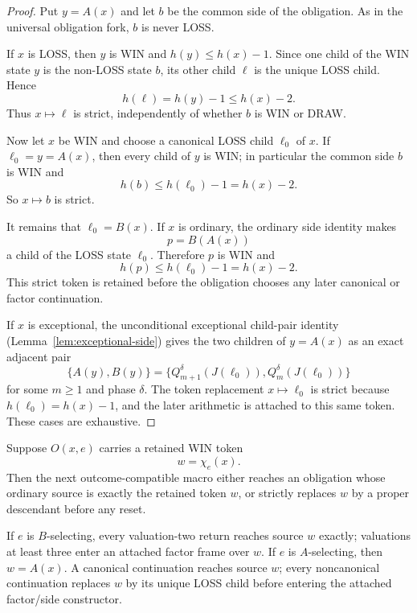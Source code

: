 \begin{proof}
Put $y=A(x)$ and let $b$ be the common side of the obligation.  As in the
universal obligation fork, $b$ is never LOSS.

If $x$ is LOSS, then $y$ is WIN and $h(y)\le h(x)-1$.  Since one child of
the WIN state $y$ is the non-LOSS state $b$, its other child $\ell$ is the
unique LOSS child.  Hence
\[
 h(\ell)=h(y)-1\le h(x)-2.
\]
Thus $x\mapsto\ell$ is strict, independently of whether $b$ is WIN or DRAW.

Now let $x$ be WIN and choose a canonical LOSS child $\ell_0$ of $x$.
If $\ell_0=y=A(x)$, then every child of $y$ is WIN; in particular the common
side $b$ is WIN and
\[
 h(b)\le h(\ell_0)-1=h(x)-2.
\]
So $x\mapsto b$ is strict.

It remains that $\ell_0=B(x)$.  If $x$ is ordinary, the ordinary side
identity makes
\[
 p=B(A(x))
\]
a child of the LOSS state $\ell_0$.  Therefore $p$ is WIN and
\[
 h(p)\le h(\ell_0)-1=h(x)-2.
\]
This strict token is retained before the obligation chooses any later
canonical or factor continuation.

If $x$ is exceptional, the unconditional exceptional child-pair identity
(Lemma~\ref{lem:exceptional-side}) gives the two children of $y=A(x)$ as an
exact adjacent pair
\[
 \{A(y),B(y)\}
 =\{Q_{m+1}^{\delta}(J(\ell_0)),Q_m^{\delta}(J(\ell_0))\}
\]
for some $m\ge1$ and phase $\delta$.  The token replacement
$x\mapsto\ell_0$ is strict because $h(\ell_0)=h(x)-1$, and the later
arithmetic is attached to this same token.  These cases are exhaustive.
\end{proof}

\begin{lemma}
\label{lem:aligned-catch}
Suppose $O(x,e)$ carries a retained WIN token
\[
 w=\chi_e(x).
\]
Then the next outcome-compatible macro either reaches an obligation whose
ordinary source is exactly the retained token $w$, or strictly replaces
$w$ by a proper descendant before any reset.

If $e$ is $B$-selecting, every valuation-two return reaches source $w$
exactly; valuations at least three enter an attached factor frame over $w$.
If $e$ is $A$-selecting, then $w=A(x)$.  A canonical continuation reaches
source $w$; every noncanonical continuation replaces $w$ by its unique LOSS
child before entering the attached factor/side constructor.
\end{lemma}

